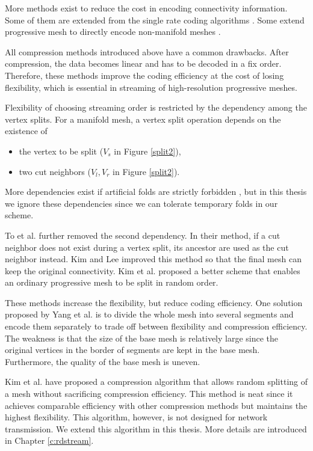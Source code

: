    More methods exist to reduce the cost in encoding connectivity information.
    Some of them are extended from the single rate coding algorithms
    \cite{319426, 383281}. Some extend progressive mesh to directly
    encode non-manifold meshes \cite{258852}.

    All compression methods introduced above 
    have a common drawbacks. After compression, the 
    data becomes linear and has to be decoded in a fix order. 
    Therefore, these methods improve the coding efficiency at the cost
    of losing flexibility, which is essential in streaming of high-resolution
    progressive meshes.
    
    Flexibility of choosing streaming order 
    is restricted by the dependency among the vertex splits.
    For a manifold mesh, a vertex split operation depends on the existence of
    \begin{itemize}
        \item 
    the vertex to be split ($V_s$ in Figure \ref{split2}), 
        \item 
    two cut neighbors ($V_l, V_r$ in Figure \ref{split2}). 
    \end{itemize}
    More dependencies exist if artificial folds are strictly forbidden \cite{258843, 258847}, 
    but in this thesis we ignore these dependencies since we can 
    tolerate temporary folds in our scheme.
     
    To et al. \cite{To1999} further removed the second dependency.
    In their method, if a cut neighbor does not exist during a vertex split,
    its ancestor are used as the cut neighbor instead.
    Kim and Lee \cite{kim01truly} improved this method so that the final mesh
    can keep the original connectivity. 
    Kim et al. \cite{multiresolution:kim} proposed a better scheme that enables
    an ordinary progressive mesh to be split in random order.

    These methods increase the flexibility, but reduce coding efficiency.
    One solution proposed by Yang et al. \cite{progressive:Yang}
    is to divide the whole mesh into several segments and encode them
    separately to trade off between flexibility and compression efficiency.
    The weakness is that the size of the base mesh is relatively large
    since the original vertices in the border of segments are kept in the base
    mesh. Furthermore, the quality of the base mesh is uneven.

    Kim et al. \cite{multiresolution:kim}
    have proposed a compression algorithm that allows random splitting of a mesh without
    sacrificing compression efficiency. This method is neat since it achieves comparable
    efficiency with other compression methods but maintains the highest flexibility.
    This algorithm, however, is not designed for 
	network transmission.  We extend this algorithm in this thesis. More details are introduced
    in Chapter \ref{c:rdstream}.  
    
